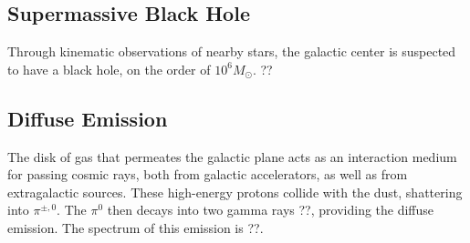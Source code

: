 \subsection{Supermassive Black Hole}

Through kinematic observations of nearby stars, the galactic center is suspected to have a black hole, on the order of $10^6 M_{\odot}$. ??

\subsection{Diffuse Emission}
The disk of gas that permeates the galactic plane acts as an interaction medium for passing cosmic rays, both from galactic accelerators, as well as from extragalactic sources.
These high-energy protons collide with the dust, shattering into $\pi^{\pm,0}$.
The $\pi^0$ then decays into two gamma rays ??, providing the diffuse emission.
The spectrum of this emission is ??.


